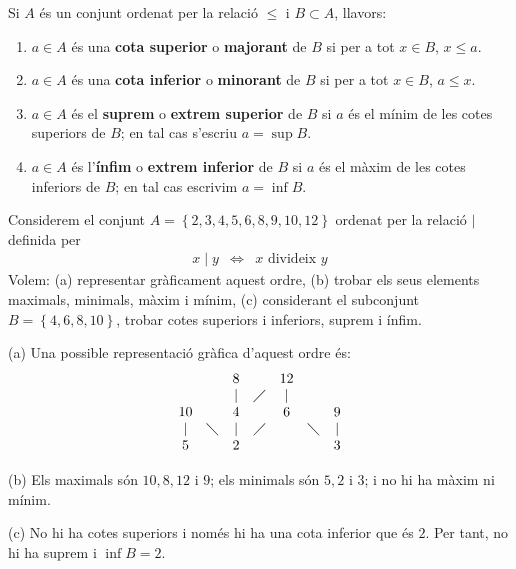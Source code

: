 Si $A$ és un conjunt ordenat per la relació $\leq$ i $B\subset A$,
llavors:

\begin{enumerate}
\item $a\in A$ és una \textbf{cota superior} o \textbf{majorant} de $B$
si per a tot $x\in B$, $x\leq a$.

\item $a\in A$ és una \textbf{cota inferior} o \textbf{minorant} de $B$
si per a tot $x\in B$, $a\leq x$.

\item $a\in A$ és el \textbf{suprem} o \textbf{extrem superior} de $B$
si $a$ és el mínim de les cotes superiors de $B$; en tal cas
s'escriu $a=\sup B$.

\item $a\in A$ és l'\textbf{ínfim} o \textbf{extrem inferior} de $B$
si $a$ és el màxim de les cotes inferiors de $B$; en tal cas
escrivim $a=\inf B$.
\end{enumerate}

\begin{exemple}
Considerem el conjunt $A=\left\{ 2,3,4,5,6,8,9,10,12\right\} $ ordenat per
la relació $\mid$ definida per%
\begin{equation*}
\begin{array}{ccc}
x\mid y & \Longleftrightarrow & x\text{ divideix }y
\end{array}
\end{equation*}
Volem: (a) representar gràficament aquest ordre, (b) trobar els seus
elements maximals, minimals, màxim i mínim, (c) considerant el
subconjunt $B=\left\{ 4,6,8,10\right\} $, trobar cotes superiors i
inferiors, suprem i ínfim.
\end{exemple}

\begin{solucio}
(a) Una possible representació gràfica d'aquest ordre és:%
\begin{equation*}
\begin{array}{ccccccc}
&  & 8 &  & 12 &  &  \\
&  & \mid & \diagup & \mid &  &  \\
10 &  & 4 &  & 6 &  & 9 \\
\mid & \diagdown & \mid & \diagup &  & \diagdown & \mid \\
5 &  & 2 &  &  &  & 3%
\end{array}
\end{equation*}

(b) Els maximals són $10,8,12$ i $9$; els minimals són $5,2$ i $3$;
i no hi ha màxim ni mínim.

(c) No hi ha cotes superiors i només hi ha una cota inferior que és $%
2$. Per tant, no hi ha suprem i $\inf B=2$.
\end{solucio}

